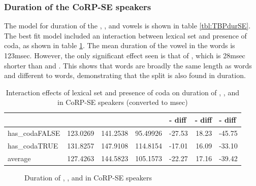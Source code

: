 \documentclass[../../../00.FullDoc/tex/APRReport-year4]{subfiles}
\begin{document}
\subsubsection{Duration of the CoRP-SE speakers}

%

The model for duration of the \trap{}, \bath{}, and \palm{} vowels is shown in table \ref{tbl:TBPdurSE}. The best fit model included an interaction between lexical set and presence of coda, as shown in table \ref{tbl:TBPdurSE-inter}. The mean duration of the vowel in the \bath{} words is 123msec. However, the only significant effect seen is that of \trap{}, which is 28msec shorter than \palm{} and \bath{}. This shows that \bath{} words are broadly the same length as \palm{} words and different to \trap{} words, demonstrating that the \TB{} split is also found in duration.

\begin{table}[htbp]
	\centering
	\begin{tabular}{lrrrrrr}
		& \multicolumn{1}{l}{\bath{}} & \multicolumn{1}{l}{\palm{}} & \multicolumn{1}{l}{\trap{}} & \multicolumn{1}{l}{\trap{}-\bath{} diff} & \multicolumn{1}{l}{\palm{}-\bath{} diff} & \multicolumn{1}{l}{\trap{}-\palm{} diff} \\
		\hline
		has\_codaFALSE & 123.0269 & 141.2538 & 95.49926 & -27.53 & 18.23 & -45.75 \\
		has\_codaTRUE & 131.8257 & 147.9108 & 114.8154 & -17.01 & 16.09 & -33.10 \\
		\hline
		average & 127.4263 & 144.5823 & 105.1573 & -22.27 & 17.16 & -39.42 \\
		\hline
	\end{tabular}%
	\caption{Interaction effects of lexical set and presence of coda on duration of \trap{}, \bath{}, and \palm{} in CoRP-SE speakers (converted to msec)} 
	\label{tbl:TBPdurSE-inter}%
\end{table}%




\begin{figure}[h]
	
	\caption{Duration of \bath{}, \palm{}, and \trap{}  in CoRP-SE speakers} \label{fig:TBPdurSE}
\end{figure}
\end{document}

